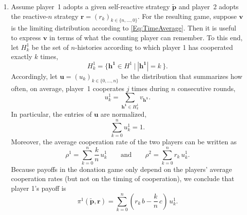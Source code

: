 \documentclass[9pt,twoside,lineno]{pnas-new}
\theoremstyle{plainCl1}
\theoremstyle{plainCl2}
\begin{document}
\begin{enumerate}
\item Assume player~1 adopts a given self-reactive strategy $\mathbf{\tilde p}$ and player~2 adopts the reactive-$n$ strategy $\mathbf{r}\!=\!(r_k)_{k\in\{n,\ldots,0\}}$. For the resulting game, suppose $\mathbf{v}$ is the limiting distribution according to \eqref{Eq:TimeAverage}. 
Then it is useful to express $\mathbf{v}$ in terms of what the counting player can remember. To this end, let $H^1_k$ be the set of $n$-histories according to which player 1 has cooperated exactly $k$ times,
\begin{equation}
H^1_k = \Big\{ \mathbf{h^1} \!\in\! H^1~\Big|~|\mathbf{h^1}|\!=\!k~\Big\}.
\end{equation}
Accordingly, let $\mathbf{u}\!=\!(u_k)_{k\in\{0,\ldots,n\}}$ be the distribution that summarizes how often, on average, player~1 cooperates $j$ times during $n$ consecutive rounds, 
\begin{equation}
u^1_k = \sum_{\mathbf{h^1} \in H^1_k} v_\mathbf{h^1}.
\end{equation}
In particular, the entries of $\mathbf{u}$ are normalized, 
\begin{equation} \label{Eq:uNormalized}
\sum_{k=0}^n u^1_k = 1. 
\end{equation}
Moreover, the average cooperation rate of the two players can be written as
\begin{equation}
\rho^1 = \sum_{k=0}^n \frac{k}{n}\,u^1_k \qquad \text{and} \qquad \rho^2 = \sum_{k=0}^n r_k\,u^1_k.
\end{equation}
Because payoffs in the donation game only depend on the players' average cooperation rates (but not on the timing of cooperation), we conclude that player 1's payoff is
\begin{equation} \label{Eq:CountingDeviationPayoff}
\pi^1(\mathbf{\tilde p},\mathbf{r}) = \sum_{k=0}^n  (r_k\,b - \frac{k}{n}\,c) \,u^1_k.
\end{equation}


\end{enumerate}
\end{document}

